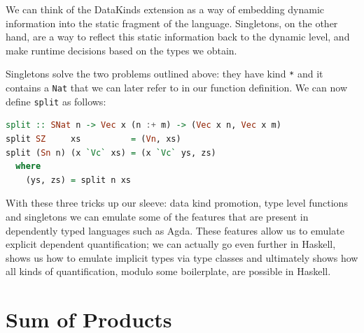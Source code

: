 \documentclass[11pt]{article}
\begin{document}
We can think of the DataKinds extension as a way of embedding dynamic information into the static fragment of 
the language. Singletons, on the other hand, are a way to reflect this static information back to 
the dynamic level, and make runtime decisions based on the types we obtain.


Singletons solve the two problems outlined above: they have kind \texttt{*}
and it contains a \texttt{Nat} that we can later refer to in our
function definition. We can now define \texttt{split} as follows:

\begin{lstlisting}[language=haskell]
split :: SNat n -> Vec x (n :+ m) -> (Vec x n, Vec x m)
split SZ     xs          = (Vn, xs)
split (Sn n) (x `Vc` xs) = (x `Vc` ys, zs)
  where
    (ys, zs) = split n xs
\end{lstlisting}

With these three tricks up our sleeve: data kind promotion, type level
functions and singletons we can emulate some of the features that are
present in dependently typed languages such as Agda. These features allow us to 
emulate explicit dependent quantification; we can actually go even further in 
Haskell, \cite{hasochism} shows us how to emulate implicit types via type 
classes and ultimately shows how all kinds of quantification, modulo some boilerplate, are possible in 
Haskell.

\section{Sum of Products}
\end{document}

